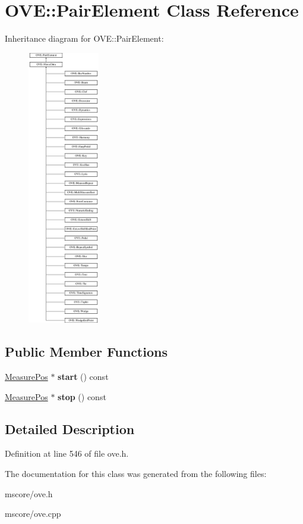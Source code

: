 \hypertarget{class_o_v_e_1_1_pair_element}{}\section{O\+VE\+:\+:Pair\+Element Class Reference}
\label{class_o_v_e_1_1_pair_element}
Inheritance diagram for O\+VE\+:\+:Pair\+Element\+:\begin{figure}[H]
\begin{center}
\leavevmode
\includegraphics[height=12.000000cm]{class_o_v_e_1_1_pair_element}
\end{center}
\end{figure}
\subsection*{Public Member Functions}
\begin{DoxyCompactItemize}
\item 
\mbox{\label{class_o_v_e_1_1_pair_element_a99f4841c9e8a9a96eb09abfbe5913761}} 
\hyperlink{class_o_v_e_1_1_measure_pos}{Measure\+Pos} $\ast$ {\bfseries start} () const
\item 
\mbox{\label{class_o_v_e_1_1_pair_element_a02b0dd1b250a9487d619f960baebc6b2}} 
\hyperlink{class_o_v_e_1_1_measure_pos}{Measure\+Pos} $\ast$ {\bfseries stop} () const
\end{DoxyCompactItemize}


\subsection{Detailed Description}


Definition at line 546 of file ove.\+h.



The documentation for this class was generated from the following files\+:\begin{DoxyCompactItemize}
\item 
mscore/ove.\+h\item 
mscore/ove.\+cpp\end{DoxyCompactItemize}
